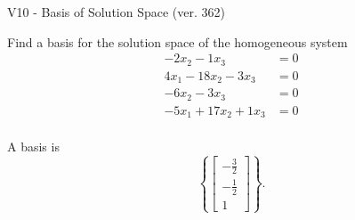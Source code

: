 \begin{exercise}
  \begin{exerciseTitle}V10 - Basis of Solution Space (ver. 362)\end{exerciseTitle}
  \begin{exerciseStatement}
    Find a basis for the solution space of the homogeneous system 
\begin{align*}
 -2 x_ 2 -1 x_ 3 &= 0  \\ 
  4 x_ 1 -18 x_ 2 -3 x_ 3 &= 0  \\ 
  -6 x_ 2 -3 x_ 3 &= 0  \\ 
  -5 x_ 1 + 17 x_ 2 + 1 x_ 3 &= 0  \\ 
 \end{align*}


 
  \end{exerciseStatement}

  \begin{exerciseAnswer}
   A basis is   
\[\left\{\left[\begin{array}{c}
-\frac{3}{2} \\
-\frac{1}{2} \\
1
\end{array}\right]\right\}.\]

  


  \end{exerciseAnswer}
\end{exercise}
